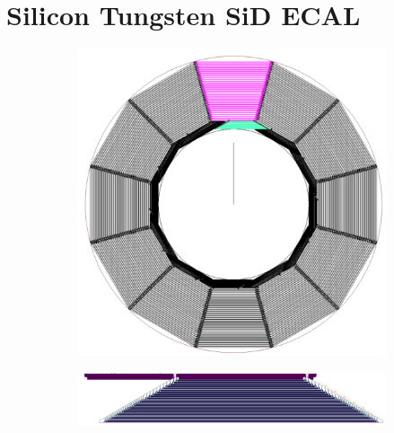 \section{Silicon Tungsten SiD ECAL}
\begin{figure}
	\centering
	\begin{subfigure}[b]{.49\textwidth}
		\includegraphics[width=\linewidth]{Calorimeter/SiliconTungstenSiD/cross_section}
		\caption{}
		\label{fig:Calorimeter:SiDECAL:crosssection}
	\end{subfigure}\hfill
	\begin{subfigure}[b]{.49\textwidth}
		\includegraphics[width=\linewidth]{Calorimeter/SiliconTungstenSiD/ecalModule}
		\caption{}
		\label{fig:Calorimeter:SiDECAL:ecalModule}
	\end{subfigure}
\end{figure}

